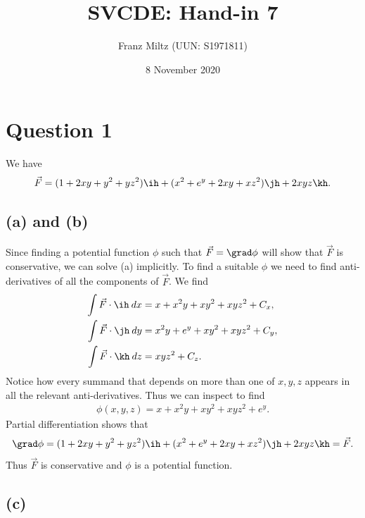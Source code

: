 \documentclass{article}
\begin{document}
\title{SVCDE: Hand-in 7}
\author{Franz Miltz (UUN: S1971811)}
\date{8 November 2020}
\maketitle


\section*{Question 1}


We have
\begin{align*}
  \vec F = (1+2xy+y^2+yz^2)\ih + (x^2+e^y+2xy+xz^2)\jh + 2xyz\kh.
\end{align*}

\subsection*{(a) and (b)}

Since finding a potential function $\phi$ such that $\vec F = \grad\phi$
will show that $\vec F$ is conservative, we can solve (a) implicitly.
To find a suitable $\phi$ we need to find anti-derivatives of all the components
of $\vec F$. We find
\begin{align*}
  \int \vec F\cdot \ih\: dx & = x + x^2y + xy^2 + xyz^2 + C_x, \\
  \int \vec F\cdot \jh\: dy & = x^2y+e^y+xy^2+xyz^2+C_y,       \\
  \int \vec F\cdot \kh\: dz & = xyz^2 + C_z.
\end{align*}
Notice how every summand that depends on more than one of $x,y,z$ appears
in all the relevant anti-derivatives. Thus we can inspect to find
\begin{align}
  \label{eqphi}
  \phi(x,y,z) = x + x^2y + xy^2 + xyz^2 + e^y.
\end{align}
Partial differentiation shows that
\begin{align*}
  \grad \phi = (1+2xy+y^2+yz^2)\ih + (x^2+e^y+2xy+xz^2)\jh + 2xyz\kh = \vec F.
\end{align*}
Thus $\vec F$ is conservative and $\phi$ is a potential function.

\subsection*{(c)}
\end{document}
